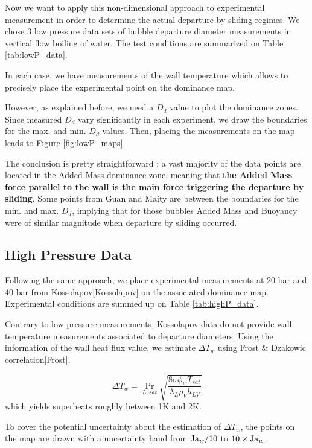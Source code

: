 Now we want to apply this non-dimensional approach to experimental measurement in order to determine the actual departure by sliding regimes. We chose 3 low pressure data sets of bubble departure diameter measurements in vertical flow boiling of water. The test conditions are summarized on Table \ref{tab:lowP_data}.

In each case, we have measurements of the wall temperature which allows to precisely place the experimental point on the dominance map.

However, as explained before, we need a $D_{d}$ value to plot the dominance zones. Since measured $D_{d}$ vary significantly in each experiment, we draw the boundaries for the max. and min. $D_{d}$ values. Then, placing the measurements on the map leads to Figure \ref{fig:lowP_maps}.


The conclusion is pretty straightforward : a vast majority of the data points are located in the Added Mass dominance zone, meaning that\textbf{ the Added Mass force parallel to the wall is the main force triggering the departure by sliding}. Some points from Guan and Maity are between the boundaries for the min. and max. $D_{d}$, implying that for those bubbles Added Mass and Buoyancy were of similar magnitude when departure by sliding occurred.




\subsection{High Pressure Data}\label{subsec:highP_dep}

Following the same approach, we place experimental measurements at 20 bar and 40 bar from Kossolapov[Kossolapov] on the associated dominance map. Experimental conditions are summed up on Table \ref{tab:highP_data}.

Contrary to low pressure measurements, Kossolapov data do not provide wall temperature measurements associated to departure diameters. Using the information of the wall heat flux value, we estimate $\Delta T_{w}$ using Frost \& Dzakowic correlation[Frost].

\begin{equation}
\Delta T_{w} = \Pr_{L,sat} \sqrt{\frac{8 \sigma \phi_{w} T_{sat}}{\lambda_{L}\rho_{V}h_{LV}}}
\label{eq:frost}
\end{equation}
which yields superheats roughly between 1K and 2K. 

To cover the potential uncertainty about the estimation of $\Delta T_{w}$, the points on the map are drawn  with a uncertainty band from $\mathrm{Ja}_{w}/10$ to $10\times \mathrm{Ja}_{w}$.


